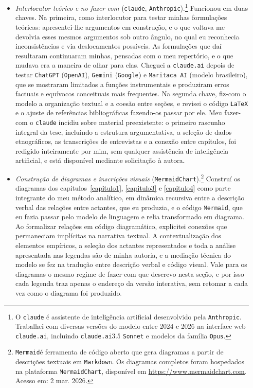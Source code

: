 \begin{itemize}

\item \textit{Interlocutor teórico e no fazer-com} (\texttt{claude}, \texttt{Anthropic}).\footnote{O \texttt{claude} é assistente de inteligência artificial desenvolvido pela \texttt{Anthropic}. Trabalhei com diversas versões do modelo entre 2024 e 2026 na interface web \texttt{claude.ai}, incluindo \texttt{claude.ai}3.5 \texttt{Sonnet} e modelos da família \texttt{Opus}.} Funcionou em duas chaves. Na primeira, como interlocutor para testar minhas formulações teóricas: apresentei-lhe argumentos em construção, e o que voltava me devolvia esses mesmos argumentos sob outro ângulo, no qual eu reconhecia inconsistências e via deslocamentos possíveis. As formulações que daí resultaram continuaram minhas, pensadas com o meu repertório, e o que mudava era a maneira de olhar para elas. Cheguei a \texttt{claude.ai} depois de testar \texttt{ChatGPT} (\texttt{OpenAI}), \texttt{Gemini} (\texttt{Google}) e \texttt{Maritaca AI} (modelo brasileiro), que se mostraram limitados a funções instrumentais e produziram erros factuais e equívocos conceituais mais frequentes. Na segunda chave, fiz-com o modelo a organização textual e a coesão entre seções, e revisei o código \texttt{LaTeX}{} e o ajuste de referências bibliográficas fazendo-os passar por ele. Meu fazer-com o \texttt{claude} incidiu sobre material preexistente: o primeiro rascunho integral da tese, incluindo a estrutura argumentativa, a seleção de dados etnográficos, as transcrições de entrevistas e a conexão entre capítulos, foi redigido inteiramente por mim, sem qualquer assistência de inteligência artificial, e está disponível mediante solicitação à autora.

\item \textit{Construção de diagramas e inscrições visuais} (\texttt{MermaidChart}).\footnote{\texttt{Mermaid}é ferramenta de código aberto que gera diagramas a partir de descrições textuais em \texttt{Markdown}. Os diagramas completos foram hospedados na plataforma \texttt{MermaidChart}, disponível em \url{https://www.mermaidchart.com}. Acesso em: 2 mar. 2026.} Construí os diagramas dos capítulos~\ref{capitulo1}, \ref{capitulo3} e \ref{capitulo4} como parte integrante do meu método analítico, em dinâmica recursiva entre a descrição verbal das relações entre actantes, que eu produzia, e o código \texttt{Mermaid}, que eu fazia passar pelo modelo de linguagem e relia transformado em diagrama. Ao formalizar relações em código diagramático, explicitei conexões que permaneciam implícitas na narrativa textual. A contextualização dos elementos empíricos, a seleção dos actantes representados e toda a análise apresentada nas legendas são de minha autoria, e a mediação técnica do modelo se fez na tradução entre descrição verbal e código visual. Vale para os diagramas o mesmo regime de fazer-com que descrevo nesta seção, e por isso cada legenda traz apenas o endereço da versão interativa, sem retomar a cada vez como o diagrama foi produzido.


\end{itemize}
